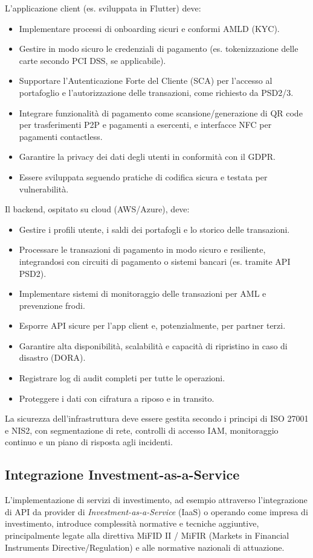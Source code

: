 L'applicazione client (es. sviluppata in Flutter) deve:
\begin{itemize}
    \item Implementare processi di onboarding sicuri e conformi AMLD (KYC).
    \item Gestire in modo sicuro le credenziali di pagamento (es. tokenizzazione delle carte secondo PCI DSS, se applicabile).
    \item Supportare l'Autenticazione Forte del Cliente (SCA) per l'accesso al portafoglio e l'autorizzazione delle transazioni, come richiesto da PSD2/3.
    \item Integrare funzionalità di pagamento come scansione/generazione di QR code per trasferimenti P2P e pagamenti a esercenti, e interfacce NFC per pagamenti contactless.
    \item Garantire la privacy dei dati degli utenti in conformità con il GDPR.
    \item Essere sviluppata seguendo pratiche di codifica sicura e testata per vulnerabilità.
\end{itemize}
Il backend, ospitato su cloud (AWS/Azure), deve:
\begin{itemize}
    \item Gestire i profili utente, i saldi dei portafogli e lo storico delle transazioni.
    \item Processare le transazioni di pagamento in modo sicuro e resiliente, integrandosi con circuiti di pagamento o sistemi bancari (es. tramite API PSD2).
    \item Implementare sistemi di monitoraggio delle transazioni per AML e prevenzione frodi.
    \item Esporre API sicure per l'app client e, potenzialmente, per partner terzi.
    \item Garantire alta disponibilità, scalabilità e capacità di ripristino in caso di disastro (DORA).
    \item Registrare log di audit completi per tutte le operazioni.
    \item Proteggere i dati con cifratura a riposo e in transito.
\end{itemize}
La sicurezza dell'infrastruttura deve essere gestita secondo i principi di ISO 27001 e NIS2, con segmentazione di rete, controlli di accesso IAM, monitoraggio continuo e un piano di risposta agli incidenti.

\subsection{Integrazione Investment-as-a-Service}
L'implementazione di servizi di investimento, ad esempio attraverso l'integrazione di API da provider di \textit{Investment-as-a-Service} (IaaS) o operando come impresa di investimento, introduce complessità normative e tecniche aggiuntive, principalmente legate alla direttiva MiFID II / MiFIR (Markets in Financial Instruments Directive/Regulation) e alle normative nazionali di attuazione.

